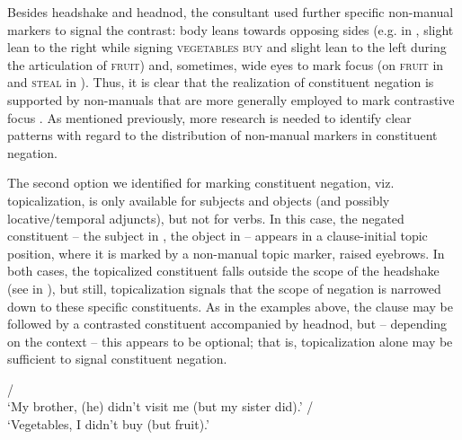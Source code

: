\documentclass[output=paper,colorlinks,citecolor=brown]{langscibook}
\begin{document}
Besides headshake and headnod, the consultant used further specific non-man\-ual markers to signal the contrast: body leans towards opposing sides (e.g. in , slight lean to the right while signing \textsc{vegetables buy} and slight lean to the left during the articulation of \textsc{fruit}) and, sometimes, wide eyes to mark focus (on \textsc{fruit} in  and \textsc{steal} in ). Thus, it is clear that the realization of constituent negation is supported by non-manuals that are more generally employed to mark contrastive focus \citep[see][]{CrasbornKooij2013}. As mentioned previously, more research is needed to identify clear patterns with regard to the distribution of non-manual markers in constituent negation. 

The second option we identified for marking constituent negation, viz. topicalization, is only available for subjects and objects (and possibly locative/temporal adjuncts), but not for verbs. In this case, the negated constituent – the subject in , the object in  – appears in a clause-initial topic position, where it is marked by a non-manual topic marker, raised eyebrows. In both cases, the topicalized constituent falls outside the scope of the headshake (see  in ), but still, topicalization signals that the scope of negation is narrowed down to these specific constituents. As in the examples above, the clause may be followed by a contrasted constituent accompanied by headnod, but – depending on the context – this appears to be optional; that is, topicalization alone may be sufficient to signal constituent negation.


\ea
    \ea\label{ex:ngt:top-subj}   /  \\ `My brother, (he) didn't visit me (but my sister did).'
    \ex\label{ex:ngt:top-obj}   /  \\ `Vegetables, I didn't buy (but fruit).'
    \z
\z
\end{document}
